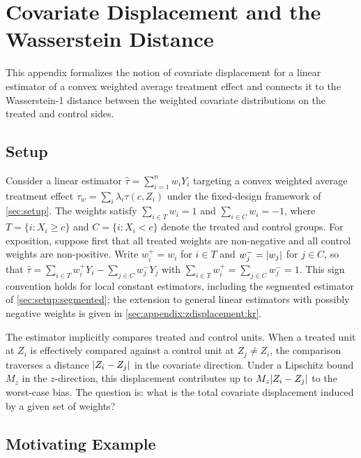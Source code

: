 \section{Covariate Displacement and the Wasserstein Distance}\label{sec:appendix:zdisplacement}

This appendix formalizes the notion of covariate displacement for a linear estimator of a convex weighted average treatment effect and connects it to the Wasserstein-1 distance between the weighted covariate distributions on the treated and control sides.

\subsection{Setup}\label{sec:appendix:zdisplacement:setup}

Consider a linear estimator $\hat{\tau} = \sum_{i=1}^n w_i Y_i$ targeting a convex weighted average treatment effect $\tau_w = \sum_i \lambda_i \tau(c, Z_i)$ under the fixed-design framework of \cref{sec:setup}.
The weights satisfy $\sum_{i \in T} w_i = 1$ and $\sum_{i \in C} w_i = -1$, where $T = \{i : X_i \geq c\}$ and $C = \{i : X_i < c\}$ denote the treated and control groups.
For exposition, suppose first that all treated weights are non-negative and all control weights are non-positive.
Write $w_i^+ = w_i$ for $i \in T$ and $w_j^- = \lvert w_j\rvert$ for $j \in C$, so that $\hat{\tau} = \sum_{i \in T} w_i^+ Y_i - \sum_{j \in C} w_j^- Y_j$ with $\sum_{i \in T} w_i^+ = \sum_{j \in C} w_j^- = 1$.
This sign convention holds for local constant estimators, including the segmented estimator of \cref{sec:setup:segmented}; the extension to general linear estimators with possibly negative weights is given in \cref{sec:appendix:zdisplacement:kr}.

The estimator implicitly compares treated and control units.
When a treated unit at $Z_i$ is effectively compared against a control unit at $Z_j \neq Z_i$, the comparison traverses a distance $\lvert Z_i - Z_j\rvert$ in the covariate direction.
Under a Lipschitz bound $M_z$ in the $z$-direction, this displacement contributes up to $M_z \lvert Z_i - Z_j\rvert$ to the worst-case bias.
The question is: what is the total covariate displacement induced by a given set of weights?

\subsection{Motivating Example}\label{sec:appendix:zdisplacement:example}

